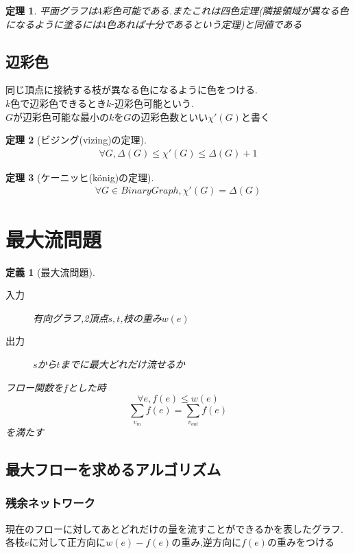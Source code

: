 \documentclass[a4j,10.5pt]{jarticle}
\theoremstyle{break}
\newtheorem{defi}{定義}[section]
\newtheorem{theo}{定理}[section]
\begin{document}
\begin{theo}
平面グラフは$4$彩色可能である.またこれは四色定理(隣接領域が異なる色になるように塗るには$4$色あれば十分であるという定理)と同値である
\end{theo}

\subsection{辺彩色}
同じ頂点に接続する枝が異なる色になるように色をつける.\\
$k$色で辺彩色できるとき$k$-辺彩色可能という.\\
$G$が辺彩色可能な最小の$k$を$G$の辺彩色数といい$\chi'(G)$と書く

\begin{theo}[ビジング(vizing)の定理]
\begin{eqnarray*}
\forall G,\Delta(G) \leq \chi'(G) \leq \Delta(G) + 1
\end{eqnarray*}
\end{theo}

\begin{theo}[ケーニッヒ(könig)の定理]
\begin{eqnarray*}
\forall G \in Binary Graph,\chi'(G) = \Delta(G)
\end{eqnarray*}
\end{theo}

\newpage

\section{最大流問題}
\begin{defi}[最大流問題]
\begin{description}
\item[入力] 有向グラフ,2頂点$s,t$,枝の重み$w(e)$
\item[出力] $s$から$t$までに最大どれだけ流せるか
\end{description}
フロー関数を$f$とした時\\
\[\forall e,f(e) \leq w(e)\]
\[\sum_{v_{in}} f(e) = \sum_{v_{out}} f(e)\]
を満たす
\end{defi}

\subsection{最大フローを求めるアルゴリズム}
\subsubsection*{残余ネットワーク}
現在のフローに対してあとどれだけの量を流すことができるかを表したグラフ.各枝$e$に対して正方向に$w(e) - f(e)$の重み,逆方向に$f(e)$の重みをつける
\end{document}
